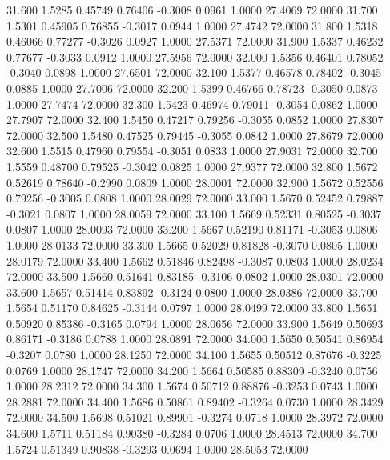   31.600   1.5285   0.45749   0.76406  -0.3008   0.0961   1.0000  27.4069  72.0000
  31.700   1.5301   0.45905   0.76855  -0.3017   0.0944   1.0000  27.4742  72.0000
  31.800   1.5318   0.46066   0.77277  -0.3026   0.0927   1.0000  27.5371  72.0000
  31.900   1.5337   0.46232   0.77677  -0.3033   0.0912   1.0000  27.5956  72.0000
  32.000   1.5356   0.46401   0.78052  -0.3040   0.0898   1.0000  27.6501  72.0000
  32.100   1.5377   0.46578   0.78402  -0.3045   0.0885   1.0000  27.7006  72.0000
  32.200   1.5399   0.46766   0.78723  -0.3050   0.0873   1.0000  27.7474  72.0000
  32.300   1.5423   0.46974   0.79011  -0.3054   0.0862   1.0000  27.7907  72.0000
  32.400   1.5450   0.47217   0.79256  -0.3055   0.0852   1.0000  27.8307  72.0000
  32.500   1.5480   0.47525   0.79445  -0.3055   0.0842   1.0000  27.8679  72.0000
  32.600   1.5515   0.47960   0.79554  -0.3051   0.0833   1.0000  27.9031  72.0000
  32.700   1.5559   0.48700   0.79525  -0.3042   0.0825   1.0000  27.9377  72.0000
  32.800   1.5672   0.52619   0.78640  -0.2990   0.0809   1.0000  28.0001  72.0000
  32.900   1.5672   0.52556   0.79256  -0.3005   0.0808   1.0000  28.0029  72.0000
  33.000   1.5670   0.52452   0.79887  -0.3021   0.0807   1.0000  28.0059  72.0000
  33.100   1.5669   0.52331   0.80525  -0.3037   0.0807   1.0000  28.0093  72.0000
  33.200   1.5667   0.52190   0.81171  -0.3053   0.0806   1.0000  28.0133  72.0000
  33.300   1.5665   0.52029   0.81828  -0.3070   0.0805   1.0000  28.0179  72.0000
  33.400   1.5662   0.51846   0.82498  -0.3087   0.0803   1.0000  28.0234  72.0000
  33.500   1.5660   0.51641   0.83185  -0.3106   0.0802   1.0000  28.0301  72.0000
  33.600   1.5657   0.51414   0.83892  -0.3124   0.0800   1.0000  28.0386  72.0000
  33.700   1.5654   0.51170   0.84625  -0.3144   0.0797   1.0000  28.0499  72.0000
  33.800   1.5651   0.50920   0.85386  -0.3165   0.0794   1.0000  28.0656  72.0000
  33.900   1.5649   0.50693   0.86171  -0.3186   0.0788   1.0000  28.0891  72.0000
  34.000   1.5650   0.50541   0.86954  -0.3207   0.0780   1.0000  28.1250  72.0000
  34.100   1.5655   0.50512   0.87676  -0.3225   0.0769   1.0000  28.1747  72.0000
  34.200   1.5664   0.50585   0.88309  -0.3240   0.0756   1.0000  28.2312  72.0000
  34.300   1.5674   0.50712   0.88876  -0.3253   0.0743   1.0000  28.2881  72.0000
  34.400   1.5686   0.50861   0.89402  -0.3264   0.0730   1.0000  28.3429  72.0000
  34.500   1.5698   0.51021   0.89901  -0.3274   0.0718   1.0000  28.3972  72.0000
  34.600   1.5711   0.51184   0.90380  -0.3284   0.0706   1.0000  28.4513  72.0000
  34.700   1.5724   0.51349   0.90838  -0.3293   0.0694   1.0000  28.5053  72.0000
